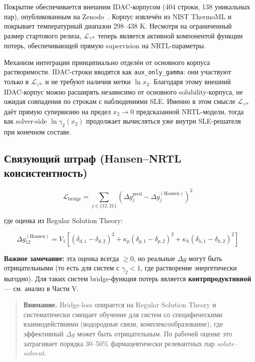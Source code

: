 \documentclass[11pt]{article}
\newcommand{\warnnote}[1]{\begin{quote}\textbf{Внимание.} #1\end{quote}}
\begin{document}
Покрытие обеспечивается внешним IDAC-корпусом (404 строки, 138 уникальных пар), опубликованным на Zenodo~\cite{idac_zenodo}. Корпус извлечён из NIST ThermoML и покрывает температурный диапазон 298--438 K. Несмотря на ограниченный размер стартового релиза, $\mathcal{L}_{\gamma^\infty}$ теперь является активной компонентой функции потерь, обеспечивающей прямую supervision на NRTL-параметры.

Механизм интеграции принципиально отделён от основного корпуса растворимости. IDAC-строки вводятся как \texttt{aux\_only\_gamma}: они участвуют только в $\mathcal{L}_{\gamma^\infty}$ и не требуют наличия метки $\ln x_2$. Благодаря этому внешний IDAC-корпус можно расширять независимо от основного solubility-корпуса, не ожидая совпадения по строкам с наблюдениями SLE. Именно в этом смысле $\mathcal{L}_{\gamma^\infty}$ даёт прямую супервизию на предел $x_2\to 0$ предсказанной NRTL-модели, тогда как solver-side $\ln\gamma_2(x_2)$ продолжает вычисляться уже внутри SLE-решателя при конечном составе.

\subsection{Связующий штраф (Hansen--NRTL консистентность)}
\label{subsec:bridge-loss}

\begin{equation*}
\mathcal{L}_{\mathrm{bridge}} = \sum_{j \in \{12, 21\}} \left(\Delta g_j^{\mathrm{pred}} - \Delta g_j^{\mathrm{(Hansen)}}\right)^2
\end{equation*}

где оценка из Regular Solution Theory:

\begin{equation*}
\Delta g_{12}^{\mathrm{(Hansen)}} = V_1 \left[(\delta_{d,1} - \delta_{d,2})^2 + \kappa_p(\delta_{p,1} - \delta_{p,2})^2 + \kappa_h(\delta_{h,1} - \delta_{h,2})^2\right]
\end{equation*}

\textbf{Важное замечание:} эта оценка всегда $\geq 0$, но реальные $\Delta g$ могут быть отрицательными (то есть для систем с $\gamma_2 < 1$, где растворение энергетически выгодно). Для таких систем bridge-функция потерь является \textbf{контрпродуктивной} --- см. анализ в Части V.

\warnnote{Bridge-loss опирается на Regular Solution Theory и систематически смещает обучение для систем со специфическими взаимодействиями (водородные связи, комплексообразование), где эффективный $\Delta g$ может быть отрицательным. По рабочей оценке это затрагивает порядка 30--50\% фармацевтически релевантных пар \textit{solute--solvent}.}
\end{document}
